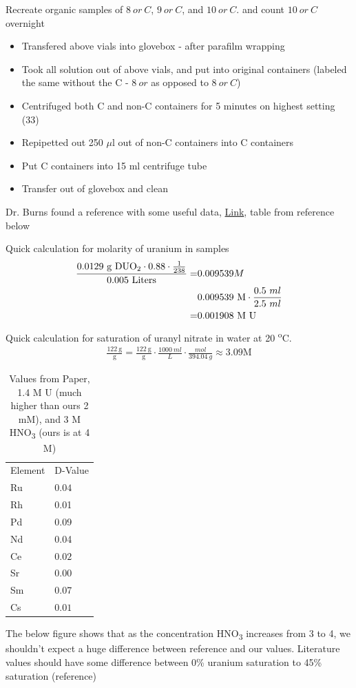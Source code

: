 \documentclass[idxtotoc,hyperref,openany,oneside]{labbook} %
\newcommand{\cmark}{\ding{51}}%
\newcommand{\done}{\rlap{$\square$}{\raisebox{2pt}{\large\hspace{1pt}\cmark}}%
  \hspace{-2.5pt}}
\newcommand{\tss}{\textsuperscript}
\newcommand{\tsbs}{\textsubscript}
\begin{document}
\begin{todolist}
\item[\done]{Recreate organic samples of $\boxed{8\ or\ C}$,
  $\boxed{9\ or\ C}$, and $\boxed{10\ or\ C}$.
  and count $\boxed{10\ or\ C}$ overnight}
  \begin{itemize}
  \item{Transfered above vials into glovebox - after parafilm wrapping}
  \item{Took all solution out of above vials, and put into original
    containers (labeled the same without the C - $\boxed{8\ or}$ as
    opposed to $\boxed{8\ or\ C}$)}
  \item{Centrifuged both C and non-C containers for 5 minutes on
    highest setting (33)}
  \item{Repipetted out 250 $\mu$l out of non-C containers into C
    containers}
  \item{Put C containers into 15 ml centrifuge tube}
  \item{Transfer out of glovebox and clean}
  \end{itemize}
\item[\done]{Dr. Burns found a reference with some useful data,
  \href{http://www.tandfonline.com/doi/abs/10.1080/07366298508918529}
       {Link}, table from reference below}
\end{todolist}
Quick calculation for molarity of uranium in samples
\begin{align*}
  \frac{0.0129\ \text{g DUO\tsbs{2}}\cdot 0.88 \cdot
  \frac{1}{238}}{0.005\
    \text{Liters}}=&0.009539M\\
  &0.009539\ \text{M}\cdot \frac{0.5\ ml}{2.5\ ml}\\
  =&0.001908\ \text{M U}
\end{align*}
Quick calculation for saturation of uranyl nitrate in water
at 20 \tss{o}C.
\begin{align*}
  \frac{122\ \text{g}}{\text{g}}=\frac{122\ \text{g}}{\text{g}}
    \cdot \frac{1000\ ml}{L}\cdot\frac{mol}{394.04\ g}\approx
    3.09 \text{M}
\end{align*}
\begin{table}[H]
\begin{center}
  \caption{Values from Paper, 1.4 M U (much higher than ours
    2 mM),
 and 3 M HNO\tsbs{3} (ours is at 4 M)}
\begin{tabular}{l l}
\toprule
Element & D-Value\\ 
Ru & $\boxed{0.04}$\\
Rh & 0.01\\
Pd & 0.09\\
Nd & 0.04\\
Ce & $\boxed{0.02}$\\
Sr & 0.00\\
Sm & 0.07\\
Cs & $\boxed{0.01}$\\
\bottomrule
\end{tabular}
\end{center}
\end{table}
The below figure shows that as the concentration
HNO\tsbs{3} increases from 3 to 4, we shouldn't expect
a huge difference between reference and our values.
Literature values should have some difference between 0\%
uranium saturation to 45\% saturation (reference)
\end{document}

